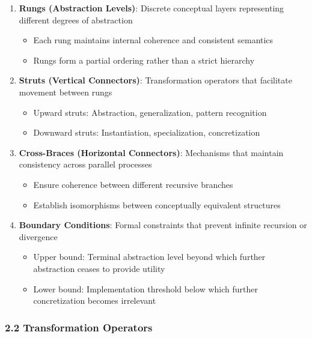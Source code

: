 \documentclass[
]{article}
\providecommand{\tightlist}{%
  \setlength{\itemsep}{0pt}\setlength{\parskip}{0pt}}
\begin{document}
\begin{enumerate}
\def\labelenumi{\arabic{enumi}.}
\tightlist
\item
  \textbf{Rungs (Abstraction Levels)}: Discrete conceptual layers
  representing different degrees of abstraction

  \begin{itemize}
  \tightlist
  \item
    Each rung maintains internal coherence and consistent semantics
  \item
    Rungs form a partial ordering rather than a strict hierarchy
  \end{itemize}
\item
  \textbf{Struts (Vertical Connectors)}: Transformation operators that
  facilitate movement between rungs

  \begin{itemize}
  \tightlist
  \item
    Upward struts: Abstraction, generalization, pattern recognition
  \item
    Downward struts: Instantiation, specialization, concretization
  \end{itemize}
\item
  \textbf{Cross-Braces (Horizontal Connectors)}: Mechanisms that
  maintain consistency across parallel processes

  \begin{itemize}
  \tightlist
  \item
    Ensure coherence between different recursive branches
  \item
    Establish isomorphisms between conceptually equivalent structures
  \end{itemize}
\item
  \textbf{Boundary Conditions}: Formal constraints that prevent infinite
  recursion or divergence

  \begin{itemize}
  \tightlist
  \item
    Upper bound: Terminal abstraction level beyond which further
    abstraction ceases to provide utility
  \item
    Lower bound: Implementation threshold below which further
    concretization becomes irrelevant
  \end{itemize}
\end{enumerate}

\subsubsection{2.2 Transformation
Operators}\label{transformation-operators}
\end{document}
